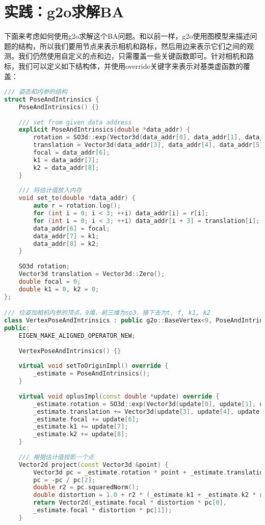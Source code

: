 \section{实践：g2o求解BA}
下面来考虑如何使用g2o求解这个BA问题。和以前一样，g2o使用图模型来描述问题的结构，所以我们要用节点来表示相机和路标，然后用边来表示它们之间的观测。我们仍然使用自定义的点和边，只需覆盖一些关键函数即可。针对相机和路标，我们可以定义如下结构体，并使用override关键字来表示对基类虚函数的覆盖：
\begin{lstlisting}[language=c++,caption=slambook2/ch9/bundle_adjustment_g2o.cpp（片段）]
/// 姿态和内参的结构
struct PoseAndIntrinsics {
	PoseAndIntrinsics() {}
	
	/// set from given data address
	explicit PoseAndIntrinsics(double *data_addr) {
		rotation = SO3d::exp(Vector3d(data_addr[0], data_addr[1], data_addr[2]));
		translation = Vector3d(data_addr[3], data_addr[4], data_addr[5]);
		focal = data_addr[6];
		k1 = data_addr[7];
		k2 = data_addr[8];
	}
	
	/// 将估计值放入内存
	void set_to(double *data_addr) {
		auto r = rotation.log();
		for (int i = 0; i < 3; ++i) data_addr[i] = r[i];
		for (int i = 0; i < 3; ++i) data_addr[i + 3] = translation[i];
		data_addr[6] = focal;
		data_addr[7] = k1;
		data_addr[8] = k2;
	}
	
	SO3d rotation;
	Vector3d translation = Vector3d::Zero();
	double focal = 0;
	double k1 = 0, k2 = 0;
};

/// 位姿加相机内参的顶点，9维，前三维为so3，接下去为t, f, k1, k2
class VertexPoseAndIntrinsics : public g2o::BaseVertex<9, PoseAndIntrinsics> {
public:
	EIGEN_MAKE_ALIGNED_OPERATOR_NEW;
	
	VertexPoseAndIntrinsics() {}
	
	virtual void setToOriginImpl() override {
		_estimate = PoseAndIntrinsics();
	}
	
	virtual void oplusImpl(const double *update) override {
		_estimate.rotation = SO3d::exp(Vector3d(update[0], update[1], update[2])) * _estimate.rotation;
		_estimate.translation += Vector3d(update[3], update[4], update[5]);
		_estimate.focal += update[6];
		_estimate.k1 += update[7];
		_estimate.k2 += update[8];
	}
	
	/// 根据估计值投影一个点
	Vector2d project(const Vector3d &point) {
		Vector3d pc = _estimate.rotation * point + _estimate.translation;
		pc = -pc / pc[2];
		double r2 = pc.squaredNorm();
		double distortion = 1.0 + r2 * (_estimate.k1 + _estimate.k2 * r2);
		return Vector2d(_estimate.focal * distortion * pc[0],
		_estimate.focal * distortion * pc[1]);
	}
	

\end{lstlisting}
